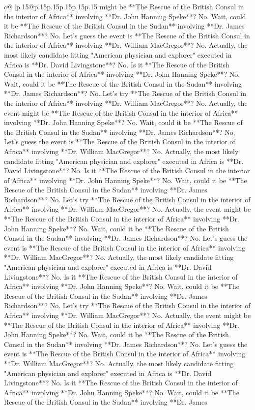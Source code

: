 \documentclass{article}
\begin{document}
{\begin{supertabular}{c@{$\;$}|p{.15\linewidth}@{}p{.15\linewidth}p{.15\linewidth}p{.15\linewidth}p{.15\linewidth}p{.15\linewidth}}
{{{might be **The Rescue of the British Consul in the interior of Africa** involving **Dr. John Hanning Speke**? No. Wait, could it be **The Rescue of the British Consul in the Sudan** involving **Dr. James Richardson**? No. Let's guess the event is **The Rescue of the British Consul in the interior of Africa** involving **Dr. William MacGregor**? No. Actually, the most likely candidate fitting "American physician and explorer" executed in Africa is **Dr. David Livingstone**? No. Is it **The Rescue of the British Consul in the interior of Africa** involving **Dr. John Hanning Speke**? No. Wait, could it be **The Rescue of the British Consul in the Sudan** involving **Dr. James Richardson**? No. Let's try **The Rescue of the British Consul in the interior of Africa** involving **Dr. William MacGregor**? No. Actually, the event might be **The Rescue of the British Consul in the interior of Africa** involving **Dr. John Hanning Speke**? No. Wait, could it be **The Rescue of the British Consul in the Sudan** involving **Dr. James Richardson**? No. Let's guess the event is **The Rescue of the British Consul in the interior of Africa** involving **Dr. William MacGregor**? No. Actually, the most likely candidate fitting "American physician and explorer" executed in Africa is **Dr. David Livingstone**? No. Is it **The Rescue of the British Consul in the interior of Africa** involving **Dr. John Hanning Speke**? No. Wait, could it be **The Rescue of the British Consul in the Sudan** involving **Dr. James Richardson**? No. Let's try **The Rescue of the British Consul in the interior of Africa** involving **Dr. William MacGregor**? No. Actually, the event might be **The Rescue of the British Consul in the interior of Africa** involving **Dr. John Hanning Speke**? No. Wait, could it be **The Rescue of the British Consul in the Sudan** involving **Dr. James Richardson**? No. Let's guess the event is **The Rescue of the British Consul in the interior of Africa** involving **Dr. William MacGregor**? No. Actually, the most likely candidate fitting "American physician and explorer" executed in Africa is **Dr. David Livingstone**? No. Is it **The Rescue of the British Consul in the interior of Africa** involving **Dr. John Hanning Speke**? No. Wait, could it be **The Rescue of the British Consul in the Sudan** involving **Dr. James Richardson**? No. Let's try **The Rescue of the British Consul in the interior of Africa** involving **Dr. William MacGregor**? No. Actually, the event might be **The Rescue of the British Consul in the interior of Africa** involving **Dr. John Hanning Speke**? No. Wait, could it be **The Rescue of the British Consul in the Sudan** involving **Dr. James Richardson**? No. Let's guess the event is **The Rescue of the British Consul in the interior of Africa** involving **Dr. William MacGregor**? No. Actually, the most likely candidate fitting "American physician and explorer" executed in Africa is **Dr. David Livingstone**? No. Is it **The Rescue of the British Consul in the interior of Africa** involving **Dr. John Hanning Speke**? No. Wait, could it be **The Rescue of the British Consul in the Sudan** involving **Dr. James }}}
\end{supertabular}}
\end{document}
